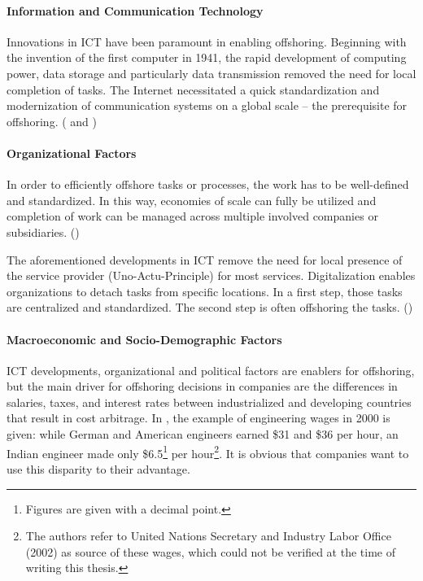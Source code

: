 \paragraph{Information and Communication Technology}
Innovations in \ac{ICT} have been paramount in enabling offshoring. Beginning with the invention of the first computer in 1941, the rapid development of computing power, data storage and particularly data transmission removed the need for local completion of tasks. The Internet necessitated a quick standardization and modernization of communication systems on a global scale -- the prerequisite for offshoring. (\cite[pp. 9f]{Hutzschenreuter.2007} and \cite[p. 93]{Jahns.2007})

\paragraph{Organizational Factors}
In order to efficiently offshore tasks or processes, the work has to be well-defined and standardized. In this way, economies of scale can fully be utilized and completion of work can be managed across multiple involved companies or subsidiaries. (\cite[p. 11]{Hutzschenreuter.2007})

The aforementioned developments in \ac{ICT} remove the need for local presence of the service provider (Uno-Actu-Principle) for most services. Digitalization enables organizations to detach tasks from specific locations. In a first step, those tasks are centralized and standardized. The second step is often offshoring the tasks. (\cite[pp. 12f]{Hutzschenreuter.2007})

\paragraph{Macroeconomic and Socio-Demographic Factors}
\ac{ICT} developments, organizational and political factors are enablers for offshoring, but the main driver for offshoring decisions in companies are the differences in salaries, taxes, and interest rates between industrialized and developing countries that result in cost arbitrage. In \cite[p. 89]{Jahns.2007}, the example of engineering wages in 2000 is given: while German and American engineers earned \$31 and \$36 per hour, an Indian engineer made only \$6.5\footnote{Figures are given with a decimal point.} per hour\footnote{The authors refer to United Nations Secretary and Industry Labor Office (2002) as source of these wages, which could not be verified at the time of writing this thesis.}. It is obvious that companies want to use this disparity to their advantage.


